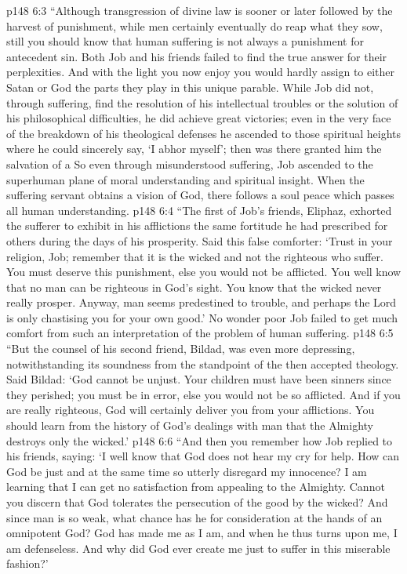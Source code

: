 \vs p148 6:3 \textcolor{ubdarkred}{“Although transgression of divine law is sooner or later followed by the harvest of punishment, while men certainly eventually do reap what they sow, still you should know that human suffering is not always a punishment for antecedent sin. Both Job and his friends failed to find the true answer for their perplexities. And with the light you now enjoy you would hardly assign to either Satan or God the parts they play in this unique parable. While Job did not, through suffering, find the resolution of his intellectual troubles or the solution of his philosophical difficulties, he did achieve great victories; even in the very face of the breakdown of his theological defenses he ascended to those spiritual heights where he could sincerely say, ‘I abhor myself’; then was there granted him the salvation of a  So even through misunderstood suffering, Job ascended to the superhuman plane of moral understanding and spiritual insight. When the suffering servant obtains a vision of God, there follows a soul peace which passes all human understanding.}
\vs p148 6:4 \textcolor{ubdarkred}{“The first of Job’s friends, Eliphaz, exhorted the sufferer to exhibit in his afflictions the same fortitude he had prescribed for others during the days of his prosperity. Said this false comforter: ‘Trust in your religion, Job; remember that it is the wicked and not the righteous who suffer. You must deserve this punishment, else you would not be afflicted. You well know that no man can be righteous in God’s sight. You know that the wicked never really prosper. Anyway, man seems predestined to trouble, and perhaps the Lord is only chastising you for your own good.’ No wonder poor Job failed to get much comfort from such an interpretation of the problem of human suffering.}
\vs p148 6:5 \textcolor{ubdarkred}{“But the counsel of his second friend, Bildad, was even more depressing, notwithstanding its soundness from the standpoint of the then accepted theology. Said Bildad: ‘God cannot be unjust. Your children must have been sinners since they perished; you must be in error, else you would not be so afflicted. And if you are really righteous, God will certainly deliver you from your afflictions. You should learn from the history of God’s dealings with man that the Almighty destroys only the wicked.’}
\vs p148 6:6 \textcolor{ubdarkred}{“And then you remember how Job replied to his friends, saying: ‘I well know that God does not hear my cry for help. How can God be just and at the same time so utterly disregard my innocence? I am learning that I can get no satisfaction from appealing to the Almighty. Cannot you discern that God tolerates the persecution of the good by the wicked? And since man is so weak, what chance has he for consideration at the hands of an omnipotent God? God has made me as I am, and when he thus turns upon me, I am defenseless. And why did God ever create me just to suffer in this miserable fashion?’}
